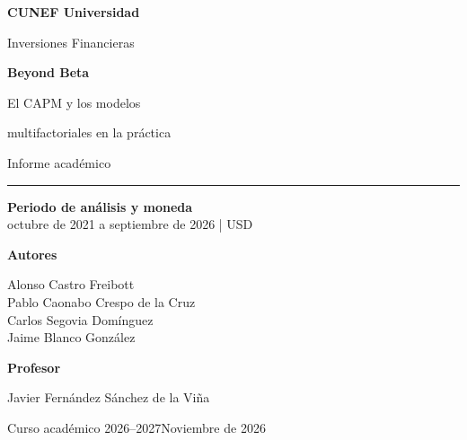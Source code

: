 \documentclass[11pt,a4paper]{article}
\begin{document}
\begin{titlepage}
\thispagestyle{empty}
\vspace*{12mm}
{\sffamily\bfseries\color{ink}CUNEF Universidad\par}
\vspace{4mm}
{\sffamily\normalsize Inversiones Financieras\par}
\vspace{20mm}
{\sffamily\bfseries\fontsize{38}{44}\selectfont\color{ink}Beyond Beta\par}
\vspace{7mm}
{\sffamily\Large\color{ink}El CAPM y los modelos\par multifactoriales en la práctica\par}
\vspace{5mm}
{\large Informe académico\par}
\vspace{9mm}
{\color{ink}\rule{\linewidth}{0.8pt}\par}
\vspace{8mm}
\colorbox{light}{\parbox{\dimexpr\linewidth-2\fboxsep\relax}{\vspace{4mm}\hspace{3mm}\textbf{Periodo de análisis y moneda}\\[2mm]\hspace{3mm}octubre de 2021 a septiembre de 2026 | USD\vspace{4mm}}}\par
\vspace{8mm}
{\sffamily\bfseries\color{ink}Autores\par}\vspace{2mm}
Alonso Castro Freibott\\
Pablo Caonabo Crespo de la Cruz\\
Carlos Segovia Domínguez\\
Jaime Blanco González\par
\vspace{7mm}
{\sffamily\bfseries\color{ink}Profesor\par}
Javier Fernández Sánchez de la Viña\par
\vfill
{\small Curso académico 2026--2027\hfill Noviembre de 2026\par}
\end{titlepage}
\setcounter{tocdepth}{2}
\renewcommand{\contentsname}{Índice de contenidos}
\renewcommand{\listfigurename}{Índice de figuras}
\renewcommand{\listtablename}{Índice de tablas}
\renewcommand{\tablename}{Tabla}
\tableofcontents
\clearpage
{}
{}
\listoffigures
\vspace{10mm}
{}
\listoftables
\clearpage
{}
\end{document}
